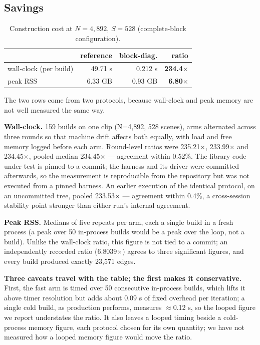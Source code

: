 \documentclass[sigconf,review,anonymous]{acmart}
\begin{document}
\subsection{Savings}

\begin{table}[t]
\footnotesize
\setlength{\tabcolsep}{4pt}
\caption{Construction cost at $N=4{,}892$, $S=528$ (complete-block configuration).}
\begin{tabular}{lrrr}
\toprule
 & reference & block-diag. & ratio \\
\midrule
wall-clock (per build) & 49.71 s & 0.212 s & \textbf{234.4\ensuremath{\times}} \\
peak RSS & 6.33 GB & 0.93 GB & \textbf{6.80\ensuremath{\times}} \\
\bottomrule
\end{tabular}
\end{table}

The two rows come from two protocols, because wall-clock and peak memory are not well
measured the same way.

\textbf{Wall-clock.} 159 builds on one clip (N=4,892, 528 scenes), arms alternated across three
rounds so that machine drift affects both equally, with load and free memory logged before
each arm. Round-level ratios were 235.21\ensuremath{\times}, 233.99\ensuremath{\times} and 234.45\ensuremath{\times}, pooled median 234.45\ensuremath{\times} ---
agreement within 0.52\%. The library code under test is pinned to a commit; the harness and its
driver were committed afterwards, so the measurement is reproducible from the
repository but was not executed from a pinned harness. An earlier execution of the identical
protocol, on an uncommitted tree, pooled 233.53\ensuremath{\times} --- agreement within 0.4\%, a cross-session
stability point stronger than either run's internal agreement.

\textbf{Peak RSS.} Medians of five repeats per arm, each a single build in a fresh process (a
peak over 50 in-process builds would be a peak over the loop, not a build). Unlike the
wall-clock ratio, this figure is not tied to a commit; an independently recorded ratio
(6.8039\ensuremath{\times}) agrees to three significant figures, and every build produced exactly 23,571 edges.

\textbf{Three caveats travel with the table; the first makes it conservative.} First, the fast
arm is timed over 50 consecutive in-process builds, which lifts it above timer resolution but
adds about 0.09 s of fixed overhead per iteration; a single cold build, as production performs,
measures \ensuremath{\approx}0.12 s, so the looped figure we report understates the ratio. It
also leaves a looped timing beside a cold-process memory figure, each protocol chosen for its
own quantity; we have not measured how a looped memory figure would move the ratio.
\end{document}
